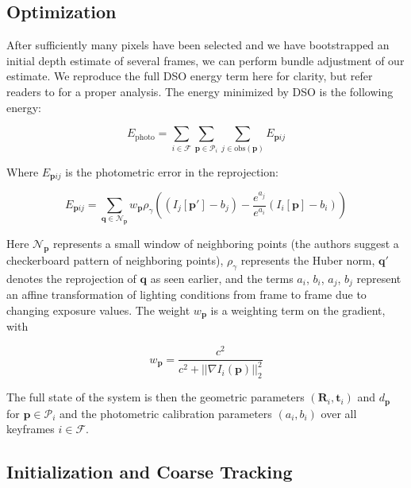 \subsection{Optimization}

After sufficiently many pixels have been selected and we have bootstrapped an initial depth estimate of several frames, we can perform bundle adjustment of our estimate. We reproduce the full DSO energy term here for clarity, but refer readers to \cite{engel2017direct} for a proper analysis. The energy minimized by DSO is the following energy:

\begin{equation}
E_{\text{photo}} = \sum_{i \in \mathcal{F}} \sum_{\boldsymbol{p} \in \mathcal{P}_i} \sum_{j \in \text{obs}(\boldsymbol{p})} E_{\boldsymbol{p}ij}
\end{equation}

Where $E_{\boldsymbol{p}ij}$ is the photometric error in the reprojection:

\begin{equation}
E_{\boldsymbol{p}ij} = \sum_{\boldsymbol{q} \in \mathcal{N}_{\boldsymbol{p}}} w_{\boldsymbol{p}} \rho_\gamma((I_j[\boldsymbol{p}'] - b_j) - \frac{e^{a_j}}{e^{a_i}}(I_i[\boldsymbol{p}] - b_i))
\end{equation}

Here $\mathcal{N}_{\boldsymbol{p}}$ represents a small window of neighboring points (the authors suggest a checkerboard pattern of neighboring points), $\rho_\gamma$ represents the Huber norm, $\boldsymbol{q}'$ denotes the reprojection of $\boldsymbol{q}$ as seen earlier, and the terms $a_i$, $b_i$, $a_j$, $b_j$ represent an affine transformation of lighting conditions from frame to frame due to changing exposure values. The weight $w_{\boldsymbol{p}}$ is a weighting term on the gradient, with

\begin{equation}
w_{\boldsymbol{p}}  = \frac{c^2}{c^2 + ||\nabla I_i(\boldsymbol{p})||_2^2}
\end{equation}

The full state of the system is then the geometric parameters $(\boldsymbol{R}_i, \boldsymbol{t}_i)$ and $d_{\boldsymbol{p}}$ for $\boldsymbol{p} \in \mathcal{P}_i$ and the photometric calibration parameters $(a_i, b_i)$ over all keyframes $i \in \mathcal{F}$.

\subsection{Initialization and Coarse Tracking}

